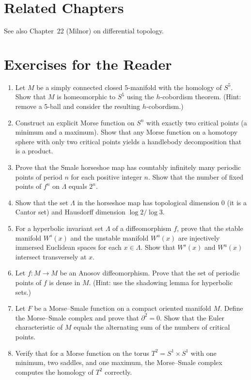 \section{Related Chapters}
See also Chapter~22 (Milnor) on differential topology.

\section*{Exercises for the Reader}

\begin{enumerate}
    \item [I] Let \(M\) be a simply connected closed 5-manifold with the homology of \(S^5\). Show that \(M\) is homeomorphic to \(S^5\) using the \(h\)-cobordism theorem. (Hint: remove a 5-ball and consider the resulting \(h\)-cobordism.)
    \item [B] Construct an explicit Morse function on \(S^n\) with exactly two critical points (a minimum and a maximum). Show that any Morse function on a homotopy sphere with only two critical points yields a handlebody decomposition that is a product.
    \item [I] Prove that the Smale horseshoe map has countably infinitely many periodic points of period \(n\) for each positive integer \(n\). Show that the number of fixed points of \(f^n\) on \(\Lambda\) equals \(2^n\).
    \item [I] Show that the set \(\Lambda\) in the horseshoe map has topological dimension 0 (it is a Cantor set) and Hausdorff dimension \(\log 2 / \log 3\).
    \item [I] For a hyperbolic invariant set \(\Lambda\) of a diffeomorphism \(f\), prove that the stable manifold \(W^s(x)\) and the unstable manifold \(W^u(x)\) are injectively immersed Euclidean spaces for each \(x \in \Lambda\). Show that \(W^s(x)\) and \(W^u(x)\) intersect transversely at \(x\).
    \item [I] Let \(f: M \to M\) be an Anosov diffeomorphism. Prove that the set of periodic points of \(f\) is dense in \(M\). (Hint: use the shadowing lemma for hyperbolic sets.)
    \item [I] Let \(F\) be a Morse--Smale function on a compact oriented manifold \(M\). Define the Morse--Smale complex and prove that \(\partial^2 = 0\). Show that the Euler characteristic of \(M\) equals the alternating sum of the numbers of critical points.
    \item [B] Verify that for a Morse function on the torus \(T^2 = S^1 \times S^1\) with one minimum, two saddles, and one maximum, the Morse--Smale complex computes the homology of \(T^2\) correctly.

\end{enumerate}
